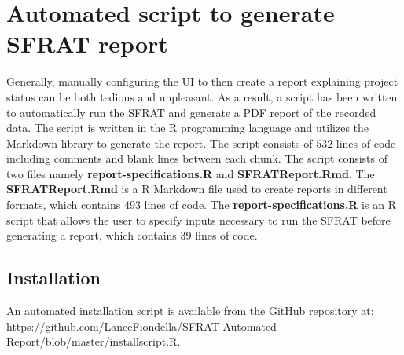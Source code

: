 \documentclass[conference]{IEEEtran}
\begin{document}
\section{Automated script to generate SFRAT report}\label{sec:Script}
Generally, manually configuring the UI to then create a report explaining project status can be both tedious and unpleasant. As a result, a script has been written to automatically run the SFRAT and generate a PDF report of the recorded data.
The script is written in the R programming language and utilizes the Markdown library to generate the report. The script consists of $532$ lines of code including comments and blank lines between each chunk. The script consists of two files namely \textbf{report-specifications.R} and \textbf{SFRATReport.Rmd}. The \textbf{SFRATReport.Rmd} is a R Markdown file used to create reports in different formats, which contains $493$ lines of code. The \textbf{report-specifications.R} is an R script that allows the user to specify inputs necessary to run the SFRAT before generating a report, which contains $39$ lines of code.

\subsection{Installation}\label{sec:ScriptInstall}
An automated installation script is available from the GitHub repository at: https://github.com/LanceFiondella/SFRAT-Automated-Report/blob/master/installscript.R.
\end{document}
